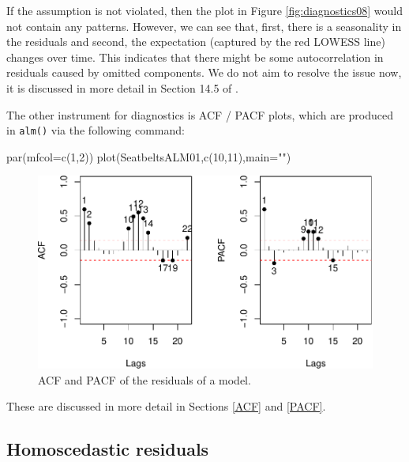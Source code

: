 \documentclass[
]{book}
\newenvironment{Shaded}{\begin{snugshade}}{\end{snugshade}}
\newcommand{\AttributeTok}[1]{\textcolor[rgb]{0.77,0.63,0.00}{#1}}
\newcommand{\DecValTok}[1]{\textcolor[rgb]{0.00,0.00,0.81}{#1}}
\newcommand{\FunctionTok}[1]{\textcolor[rgb]{0.00,0.00,0.00}{#1}}
\newcommand{\NormalTok}[1]{#1}
\newcommand{\StringTok}[1]{\textcolor[rgb]{0.31,0.60,0.02}{#1}}
\theoremstyle{definition}
\theoremstyle{definition}
\theoremstyle{definition}
\theoremstyle{definition}
\theoremstyle{remark}
\begin{document}
If the assumption is not violated, then the plot in Figure \ref{fig:diagnostics08} would not contain any patterns. However, we can see that, first, there is a seasonality in the residuals and second, the expectation (captured by the red LOWESS line) changes over time. This indicates that there might be some autocorrelation in residuals caused by omitted components. We do not aim to resolve the issue now, it is discussed in more detail in Section 14.5 of \citet{SvetunkovADAM}.

The other instrument for diagnostics is ACF / PACF plots, which are produced in \texttt{alm()} via the following command:

\begin{Shaded}
\begin{Highlighting}[]
\FunctionTok{par}\NormalTok{(}\AttributeTok{mfcol=}\FunctionTok{c}\NormalTok{(}\DecValTok{1}\NormalTok{,}\DecValTok{2}\NormalTok{))}
\FunctionTok{plot}\NormalTok{(SeatbeltsALM01,}\FunctionTok{c}\NormalTok{(}\DecValTok{10}\NormalTok{,}\DecValTok{11}\NormalTok{),}\AttributeTok{main=}\StringTok{""}\NormalTok{)}
\end{Highlighting}
\end{Shaded}

\begin{figure}
\centering
\includegraphics{Svetunkov---Statistics-for-Business-Analytics_files/figure-latex/diagnostics09-1.pdf}
\caption{\label{fig:diagnostics09}ACF and PACF of the residuals of a model.}
\end{figure}

These are discussed in more detail in Sections \ref{ACF} and \ref{PACF}.

\hypertarget{assumptionsResidualsAreIIDHomoscedasticity}{%
\subsection{Homoscedastic residuals}\label{assumptionsResidualsAreIIDHomoscedasticity}}
\end{document}
